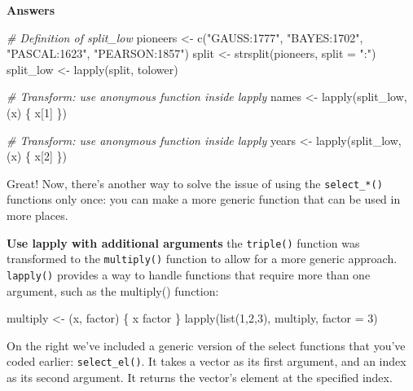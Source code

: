 \documentclass[]{article}
\newcommand{\hlnum}[1]{\textcolor[rgb]{0.816,0.125,0.439}{#1}}%
\newcommand{\hlstr}[1]{\textcolor[rgb]{0.251,0.627,0.251}{#1}}%
\newcommand{\hlcom}[1]{\textcolor[rgb]{0.502,0.502,0.502}{\textit{#1}}}%
\newcommand{\hlstd}[1]{\textcolor[rgb]{0.251,0.251,0.251}{#1}}%
\newcommand{\hlkwc}[1]{\textcolor[rgb]{0.251,0.251,0.251}{#1}}%
\newcommand{\hlkwd}[1]{\textcolor[rgb]{0.878,0.439,0.125}{#1}}%
\newenvironment{Shaded}{\begin{myshaded}}{\end{myshaded}}
\newcommand{\KeywordTok}[1]{\hlkwd{#1}}
\newcommand{\DataTypeTok}[1]{\hlkwc{#1}}
\newcommand{\DecValTok}[1]{\hlnum{#1}}
\newcommand{\StringTok}[1]{\hlstr{#1}}
\newcommand{\CommentTok}[1]{\hlcom{#1}}
\newcommand{\NormalTok}[1]{\hlstd{#1}}
\begin{document}
\textbf{Answers}

\begin{Shaded}
\begin{Highlighting}[]
\CommentTok{# Definition of split_low}
\NormalTok{pioneers <-}\StringTok{ }\KeywordTok{c}\NormalTok{(}\StringTok{"GAUSS:1777"}\NormalTok{, }\StringTok{"BAYES:1702"}\NormalTok{, }\StringTok{"PASCAL:1623"}\NormalTok{, }\StringTok{"PEARSON:1857"}\NormalTok{)}
\NormalTok{split <-}\StringTok{ }\KeywordTok{strsplit}\NormalTok{(pioneers, }\DataTypeTok{split =} \StringTok{":"}\NormalTok{)}
\NormalTok{split_low <-}\StringTok{ }\KeywordTok{lapply}\NormalTok{(split, tolower)}

\CommentTok{# Transform: use anonymous function inside lapply}
\NormalTok{names <-}\StringTok{ }\KeywordTok{lapply}\NormalTok{(split_low, }\NormalTok{(x) \{ x[}\DecValTok{1}\NormalTok{] \})}

\CommentTok{# Transform: use anonymous function inside lapply}
\NormalTok{years <-}\StringTok{ }\KeywordTok{lapply}\NormalTok{(split_low, }\NormalTok{(x) \{ x[}\DecValTok{2}\NormalTok{] \})}
\end{Highlighting}
\end{Shaded}

Great! Now, there's another way to solve the issue of using the
\texttt{select\_*()} functions only once: you can make a more generic
function that can be used in more places.

\textbf{Use lapply with additional arguments} the \texttt{triple()}
function was transformed to the \texttt{multiply()} function to allow
for a more generic approach. \texttt{lapply()} provides a way to handle
functions that require more than one argument, such as the multiply()
function:

\begin{Shaded}
\begin{Highlighting}[]
\NormalTok{multiply <-}\StringTok{ }\NormalTok{(x, factor) \{}
\NormalTok{  x }\OperatorTok{*}\StringTok{ }\NormalTok{factor}
\NormalTok{\}}
\KeywordTok{lapply}\NormalTok{(}\KeywordTok{list}\NormalTok{(}\DecValTok{1}\NormalTok{,}\DecValTok{2}\NormalTok{,}\DecValTok{3}\NormalTok{), multiply, }\DataTypeTok{factor =} \DecValTok{3}\NormalTok{)}
\end{Highlighting}
\end{Shaded}

On the right we've included a generic version of the select functions
that you've coded earlier: \texttt{select\_el()}. It takes a vector as
its first argument, and an index as its second argument. It returns the
vector's element at the specified index.
\end{document}
